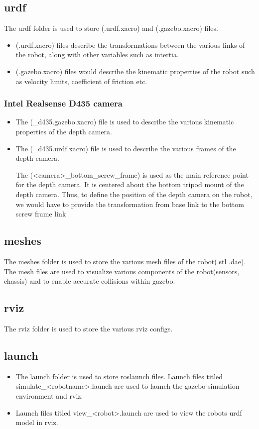 \documentclass[11pt]{article}
\begin{document}
\subsection{urdf}
The urdf folder is used to store (.urdf.xacro) and (.gazebo.xacro) files.
\begin{itemize}
 \item {
       (.urdf.xacro) files describe the transformations between the various links of the robot, along with other variables such as intertia.
       }
 \item{
       (.gazebo.xacro) files would describe the kinematic properties of the robot such as velocity limits, coefficient of friction etc.
       }
\end{itemize}
\subsubsection{Intel Realsense D435 camera}
\begin{itemize}
 \item {
       The (\_d435.gazebo.xacro) file is used to describe the various kinematic properties of the depth camera.
       }
 \item{
       The (\_d435.urdf.xacro) file is used to describe the various frames of the depth camera.
       
       The (<camera>\_bottom\_screw\_frame) is used as the main reference point for the depth camera. It is centered about the bottom tripod mount of the depth camera.
       Thus, to define the position of the depth camera on the robot, we would have to provide the transformation from base link to the bottom screw frame link
       }
\end{itemize}

\subsection{meshes}
The meshes folder is used to store the various mesh files of the robot(.stl .dae).
The mesh files are used to visualize various components of the robot(sensors, chassis) and to enable accurate collisions within gazebo.

\subsection{rviz}
The rviz folder is used to store the various rviz configs.

\subsection{launch}
\begin{itemize}
 \item{
       
       The launch folder is used to store roslaunch files. Launch files titled simulate\_<robotname>.launch are used to launch the gazebo simulation environment and rviz.
       }
 \item{
       Launch files titled view\_<robot>.launch are used to view the robots urdf model in rviz.
       }
\end{itemize}
\end{document}
